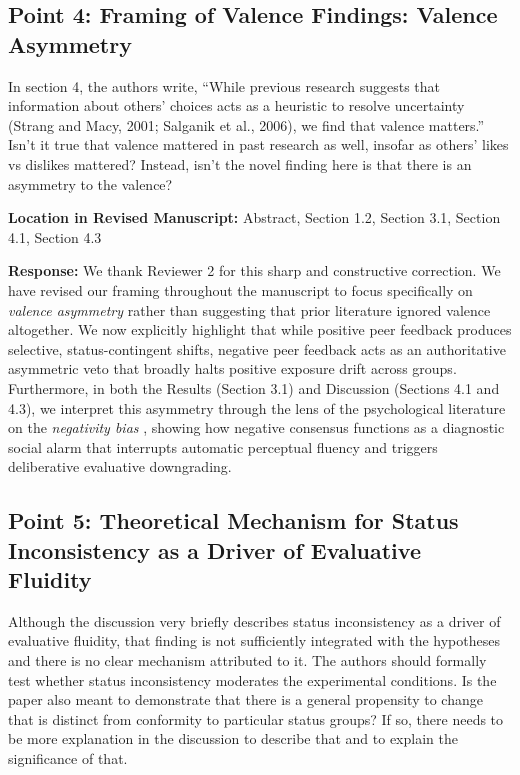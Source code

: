 \documentclass[11pt, letterpaper]{article}
\begin{document}
\subsection*{Point 4: Framing of Valence Findings: Valence Asymmetry}

\begin{reviewercomment}
In section 4, the authors write, ``While previous research suggests that information about others' choices acts as a heuristic to resolve uncertainty (Strang and Macy, 2001; Salganik et al., 2006), we find that valence matters.'' Isn't it true that valence mattered in past research as well, insofar as others' likes vs dislikes mattered? Instead, isn't the novel finding here is that there is an asymmetry to the valence?
\end{reviewercomment}

\textbf{Location in Revised Manuscript:} Abstract, Section 1.2, Section 3.1, Section 4.1, Section 4.3

\textbf{Response:}
We thank Reviewer 2 for this sharp and constructive correction. We have revised our framing throughout the manuscript to focus specifically on \textit{valence asymmetry} rather than suggesting that prior literature ignored valence altogether. We now explicitly highlight that while positive peer feedback produces selective, status-contingent shifts, negative peer feedback acts as an authoritative asymmetric veto that broadly halts positive exposure drift across groups. Furthermore, in both the Results (Section 3.1) and Discussion (Sections 4.1 and 4.3), we interpret this asymmetry through the lens of the psychological literature on the \textit{negativity bias} \citep{rozin2001negativity-01e, baumeister2001bad-19b}, showing how negative consensus functions as a diagnostic social alarm that interrupts automatic perceptual fluency and triggers deliberative evaluative downgrading.

\vspace{10pt}

\subsection*{Point 5: Theoretical Mechanism for Status Inconsistency as a Driver of Evaluative Fluidity}

\begin{reviewercomment}
Although the discussion very briefly describes status inconsistency as a driver of evaluative fluidity, that finding is not sufficiently integrated with the hypotheses and there is no clear mechanism attributed to it. The authors should formally test whether status inconsistency moderates the experimental conditions. Is the paper also meant to demonstrate that there is a general propensity to change that is distinct from conformity to particular status groups? If so, there needs to be more explanation in the discussion to describe that and to explain the significance of that.
\end{reviewercomment}
\end{document}

